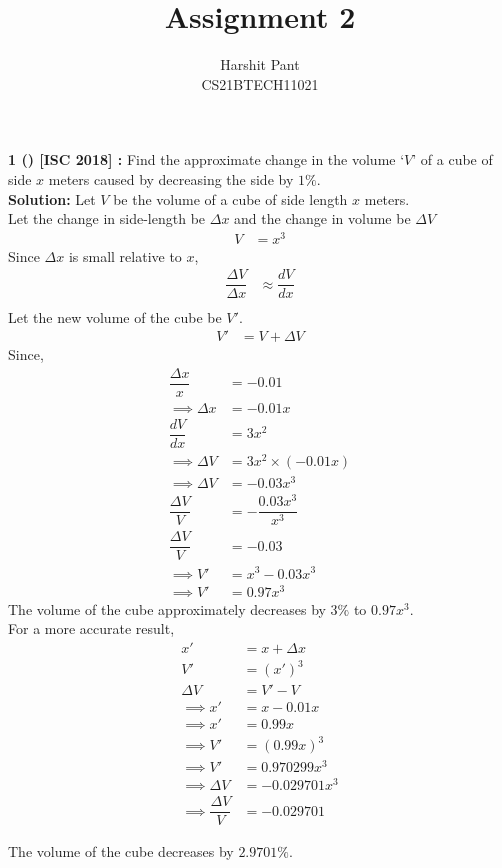 \documentclass[journal,12pt,twocolumn]{IEEEtran}
\title{Assignment 2}
\author{Harshit Pant\\CS21BTECH11021}
\date{}
\begin{document}
\maketitle
\textbf{1 () [ISC 2018] :}
Find the approximate change in the volume `$V$' of a cube of side $x$ meters caused by decreasing the side by $1\%$.\\

\textbf{Solution:} Let $V$ be the volume of a cube of side length $x$ meters.\\
Let the change in side-length be $\Delta x$ and the change in volume be $\Delta V$
\begin{align}
V&=x^3
\end{align}
Since $\Delta x$ is small relative to $x$,
\addtolength{\jot}{.1in}
\begin{align}
\dfrac{\Delta V}{\Delta x}&\approx\dfrac{dV}{dx}\\
\end{align}
Let the new volume of the cube be $V'$.
\begin{align}
V'&=V+\Delta V
\end{align}
Since,
\begin{align}
\dfrac{\Delta x}{x}&=-0.01\\
\implies\Delta x&=-0.01x\\
\dfrac{dV}{dx}&=3x^2\\
\implies\Delta V&=3x^2\times(-0.01x)\\
\implies\Delta V&=-0.03x^3\\
\dfrac{\Delta V}{V}&=-\dfrac{0.03x^3}{x^3}\\
\dfrac{\Delta V}{V}&=-0.03\\
\implies V'&=x^3-0.03x^3\\
\implies V'&=0.97x^3
\end{align}
The volume of the cube approximately decreases by $3\%$  to $0.97x^3$.\\

For a more accurate result,
\begin{align}
x'&=x+\Delta x\\
V'&=(x')^3\\
\Delta V&=V'-V\\
\implies x'&=x-0.01x\\
\implies x'&=0.99x\\
\implies V'&=(0.99x)^3\\
\implies V'&=0.970299x^3\\
\implies \Delta V&=-0.029701x^3\\
\implies \dfrac{\Delta V}{V}&=-0.029701
\end{align}

The volume of the cube decreases by $2.9701\%$.
\end{document}

